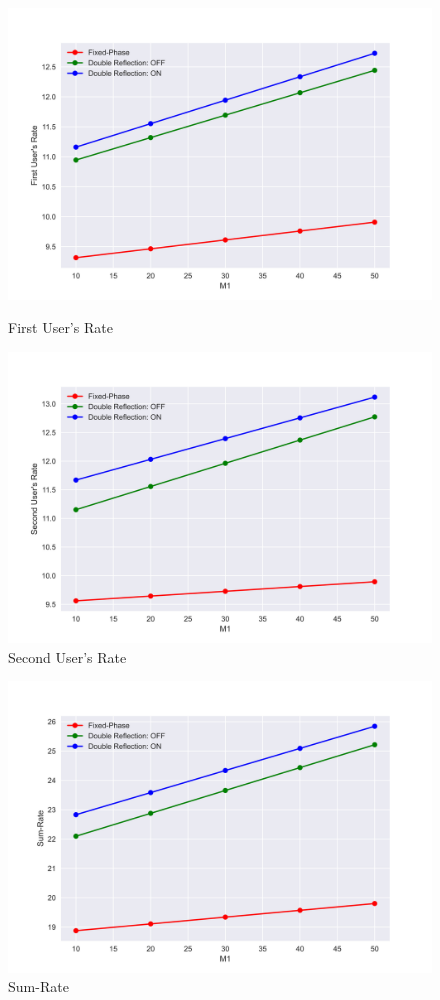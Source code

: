 \documentclass{article}
\begin{document}
\begin{figure}[!h]
	\centering
	\begin{minipage}{.5\textwidth}
		\flushleft
		\includegraphics[width=0.95\linewidth]{No Blockage First User's Rate}
		\caption{First User's Rate}
	\end{minipage}%
	\vline
	\begin{minipage}{.5\textwidth}
		\flushright			
		\includegraphics[width=0.95\linewidth]{No Blockage Second User's Rate}
		\caption{Second User's Rate}
	\end{minipage}
\end{figure}

\begin{figure}[!h]
	\centering
	\includegraphics[width=0.95\linewidth]{No Blockage Sum-Rate}
	\caption{Sum-Rate}
\end{figure}
\end{document}
